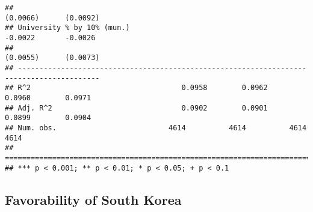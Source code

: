 \documentclass[
]{article}
\begin{document}
\begin{verbatim}
##                                                                  (0.0066)      (0.0092)  
## University % by 10% (mun.)                                       -0.0022       -0.0026   
##                                                                  (0.0055)      (0.0073)  
## -----------------------------------------------------------------------------------------
## R^2                                   0.0958        0.0962        0.0960        0.0971   
## Adj. R^2                              0.0902        0.0901        0.0899        0.0904   
## Num. obs.                          4614          4614          4614          4614        
## =========================================================================================
## *** p < 0.001; ** p < 0.01; * p < 0.05; + p < 0.1
\end{verbatim}

\hypertarget{favorability-of-south-korea-1}{%
\subsection{Favorability of South
Korea}\label{favorability-of-south-korea-1}}
\end{document}
